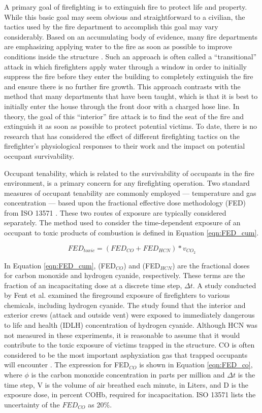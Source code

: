 \documentclass[12pt,oneside]{article}
\begin{document}
A primary goal of firefighting is to extinguish fire to protect life and property. While this basic goal may seem obvious and straightforward to a civilian, the tactics used by the fire department to accomplish this goal may vary considerably. Based on an accumulating body of evidence, many fire departments are emphasizing applying water to the fire as soon as possible to improve conditions inside the structure \cite{DHS2010}. Such an approach is often called a ``transitional'' attack in which firefighters apply water through a window in order to initially suppress the fire before they enter the building to completely extinguish the fire and ensure there is no further fire growth.  This approach contrasts with the method that many departments that have been taught, which is that it is best to initially enter the house through the front door with a charged hose line. In theory, the goal of this ``interior'' fire attack is to find the seat of the fire and extinguish it as soon as possible to protect potential victims. To date, there is no research that has considered the effect of different firefighting tactics on the firefighter's physiological responses to their work and the impact on potential occupant survivability.

Occupant tenability, which is related to the survivability of occupants in the fire environment, is a primary concern for any firefighting operation.  Two standard measures of occupant tenability are commonly employed --- temperature and gas concentration --- based upon the fractional effective dose methodology (FED) from ISO 13571 \cite{ISO13571}. These two routes of exposure are typically considered separately. The method used to consider the time-dependent exposure of an occupant to toxic products of combustion is defined in Equation \ref{eqn:FED_cum}. 

\begin{equation}\label{eqn:FED_cum}FED_{toxic}=(FED_{CO}+FED_{HCN})*v_{CO_2}\end{equation}

In Equation \ref{eqn:FED_cum},  (FED$_{CO}$) and  (FED$_{HCN}$) are the fractional doses for carbon monoxide and hydrogen cyanide, respectively. These terms are the fraction of an incapacitating dose at a discrete time step, $\Delta t$. A study conducted by Fent et al. \cite{Fent:2017} examined the fireground exposure of firefighters to various chemicals, including hydrogen cyanide. The study found that the interior and exterior crews (attack and outside vent) were exposed to immediately dangerous to life and health (IDLH) concentration of hydrogen cyanide. Although HCN was not measured in these experiments, it is reasonable to assume that it would contribute to the toxic exposure of victims trapped in the structure. CO is often considered to be the most important asphyxiation gas that trapped occupants will encounter \cite{SFPE:Purser}. The expression for FED$_{CO}$ is shown in Equation \ref{eqn:FED_co}, where $\phi$ is the carbon monoxide concentration in parts per million and $\Delta t $ is the time step, V is the volume of air breathed each minute, in Liters, and D is the exposure dose, in percent COHb, required for incapacitation. ISO 13571 \cite{ISO13571} lists the uncertainty of the $FED_{CO}$ as 20\%.
\end{document}
